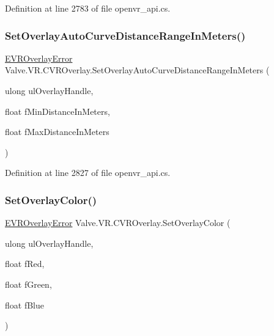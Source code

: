 Definition at line 2783 of file openvr\+\_\+api.\+cs.

\mbox{\label{class_valve_1_1_v_r_1_1_c_v_r_overlay_af14a68350c5c9c43e3363a0d40456a36}} 
\subsubsection{\texorpdfstring{SetOverlayAutoCurveDistanceRangeInMeters()}{SetOverlayAutoCurveDistanceRangeInMeters()}}
{\footnotesize\ttfamily \mbox{\hyperlink{namespace_valve_1_1_v_r_aaee5c5144f42b7969d45b854f51b0c18}{E\+V\+R\+Overlay\+Error}} Valve.\+V\+R.\+C\+V\+R\+Overlay.\+Set\+Overlay\+Auto\+Curve\+Distance\+Range\+In\+Meters (\begin{DoxyParamCaption}\item[{ulong}]{ul\+Overlay\+Handle,  }\item[{float}]{f\+Min\+Distance\+In\+Meters,  }\item[{float}]{f\+Max\+Distance\+In\+Meters }\end{DoxyParamCaption})}



Definition at line 2827 of file openvr\+\_\+api.\+cs.

\mbox{\label{class_valve_1_1_v_r_1_1_c_v_r_overlay_ad2423261de779a1da057aedd586e4ce1}} 
\subsubsection{\texorpdfstring{SetOverlayColor()}{SetOverlayColor()}}
{\footnotesize\ttfamily \mbox{\hyperlink{namespace_valve_1_1_v_r_aaee5c5144f42b7969d45b854f51b0c18}{E\+V\+R\+Overlay\+Error}} Valve.\+V\+R.\+C\+V\+R\+Overlay.\+Set\+Overlay\+Color (\begin{DoxyParamCaption}\item[{ulong}]{ul\+Overlay\+Handle,  }\item[{float}]{f\+Red,  }\item[{float}]{f\+Green,  }\item[{float}]{f\+Blue }\end{DoxyParamCaption})}



